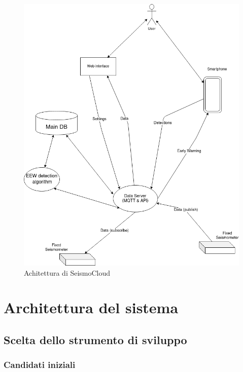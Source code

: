 \documentclass[a4paper,10pt]{memoir}
\begin{document}
\begin{figure}
\caption{Achitettura di SeismoCloud}
\label{fig:ArchitetturaSeismoCloud}
\includegraphics[width=1\textwidth]{Chapter-1/architettura-seismocloud.png}
\end{figure}

\clearpage

\chapter{Architettura del sistema}

\section{Scelta dello strumento di sviluppo}

\subsection{Candidati iniziali}
\end{document}
